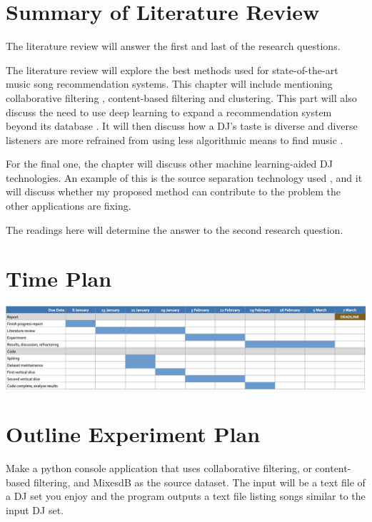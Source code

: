 \documentclass[11pt,titlepage,oneside]{book}
\begin{document}
	
\section{Summary of Literature Review}
\begin{flushleft}
	The literature review will answer the first and last of the research questions.
\end{flushleft}
\begin{flushleft}
	The literature review will explore the best methods used for state-of-the-art music song recommendation systems. This chapter will include mentioning collaborative filtering \citep{chow_music_2020-1}, content-based filtering \citep{chang_building_2021} and clustering\citep{piyush_building_2019}. This part will also discuss the need to use deep learning to expand a recommendation system beyond its database \citep{chow_music_2020}. It will then discuss how a DJ's taste is diverse and diverse listeners are more refrained from using less algorithmic means to find music \citep{anderson_algorithmic_2020}.
\end{flushleft}
\begin{flushleft}
	For the final one, the chapter will discuss other machine learning-aided DJ technologies. An example of this is the source separation technology used \citep{kirn_review_2023}, and it will discuss whether my proposed method can contribute to the problem the other applications are fixing.
\end{flushleft}
\begin{flushleft}
	The readings here will determine the answer to the second research question.
	
\end{flushleft}

\section{Time Plan}

\includegraphics[width=\columnwidth]{timePlan}



\section{Outline Experiment Plan}
Make a python console application that uses collaborative filtering, or content-based filtering, and MixesdB as the source dataset. The input will be a text file of a DJ set you enjoy and the program outputs a text file listing songs similar to the input DJ set.
\end{document}
